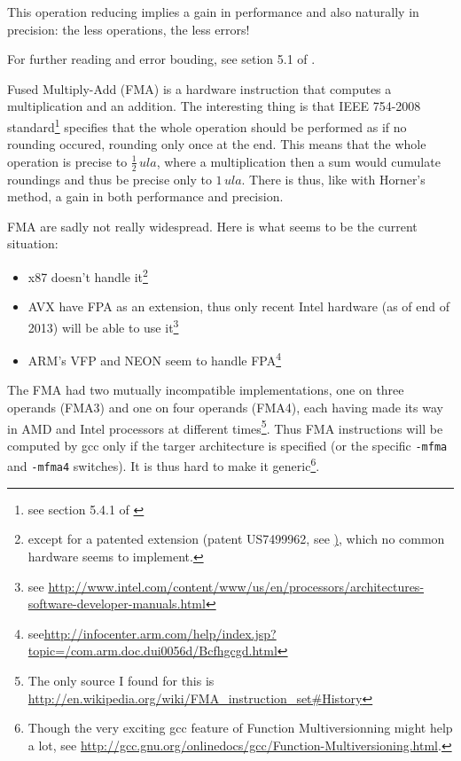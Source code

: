 This operation reducing implies a gain in performance and also naturally in precision: the less operations, the less errors!

For further reading and error bouding, see setion 5.1 of \cite{Higham}.



Fused Multiply-Add (FMA) is a hardware instruction that computes a multiplication and an addition. The interesting thing is that IEEE 754-2008 standard\footnote{see section 5.4.1 of \cite{IEEE754}} specifies that the whole operation should be performed as if no rounding occured, rounding only once at the end. This means that the whole operation is precise to $\frac{1}{2}\,ula$, where a multiplication then a sum would cumulate roundings and thus be precise only to $1\,ula$. There is thus, like with Horner's method, a gain in both performance and precision.


FMA are sadly not really widespread. Here is what seems to be the current situation:
\begin{itemize}
\item x87 doesn't handle it\footnote{except for a patented extension (patent US7499962, see \href{http://www.google.com/patents/US7499962}), which no common hardware seems to implement.}
\item AVX have FPA as an extension, thus only recent Intel hardware (as of end of 2013) will be able to use it\footnote{see \url{http://www.intel.com/content/www/us/en/processors/architectures-software-developer-manuals.html}\TODO}
\item ARM's VFP and NEON seem to handle FPA\footnote{see\url{http://infocenter.arm.com/help/index.jsp?topic=/com.arm.doc.dui0056d/Bcfhgcgd.html}}
\end{itemize}

The FMA had two mutually incompatible implementations, one on three operands (FMA3) and one on four operands (FMA4), each having made its way in AMD and Intel processors at different times\footnote{The only source I found for this is \url{http://en.wikipedia.org/wiki/FMA\_instruction\_set\#History}}. Thus FMA instructions will be computed by gcc only if the targer architecture is specified (or the specific \texttt{-mfma} and \texttt{-mfma4} switches). It is thus hard to make it generic\footnote{Though the very exciting gcc feature of Function Multiversionning might help a lot, see \url{http://gcc.gnu.org/onlinedocs/gcc/Function-Multiversioning.html}.}.

